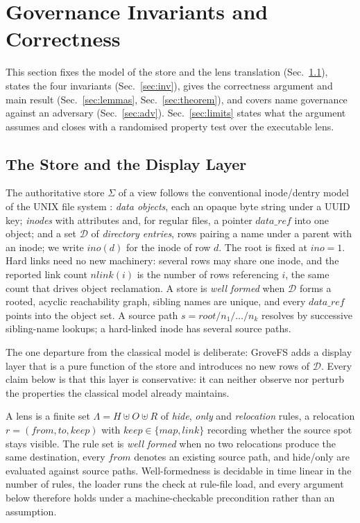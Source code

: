 \documentclass[numberedsection,acmtos]{acmart}
\begin{document}
\section{Governance Invariants and Correctness}
\label{sec:formal}

This section fixes the model of the store and the lens translation
(Sec.~\ref{sec:model}), states the four invariants (Sec.~\ref{sec:inv}), gives
the correctness argument and main result (Sec.~\ref{sec:lemmas},
Sec.~\ref{sec:theorem}), and covers name governance against an adversary
(Sec.~\ref{sec:adv}). Sec.~\ref{sec:limits} states what the argument assumes
and closes with a randomised property test over the executable lens.

\subsection{The Store and the Display Layer}
\label{sec:model}

The authoritative store $\Sigma$ of a view follows the conventional
inode/dentry model of the UNIX file system \citep{fuse,unix}: \emph{data
objects}, each an opaque byte string under a UUID key; \emph{inodes} with
attributes and, for regular files, a pointer $\mathit{data\_ref}$ into one
object; and a set $\mathcal{D}$ of \emph{directory entries}, rows pairing a
name under a parent with an inode; we write $\mathit{ino}(d)$ for the inode of
row $d$. The root is fixed at $\mathit{ino}=1$. Hard links need no new
machinery: several rows may share one inode, and the reported link count
$\mathit{nlink}(i)$ is the number of rows referencing $i$, the same count that
drives object reclamation. A store is \emph{well formed} when $\mathcal{D}$
forms a rooted, acyclic reachability graph, sibling names are unique, and
every $\mathit{data\_ref}$ points into the object set. A source path
$s=\mathit{root}/n_1/\dots/n_k$ resolves by successive sibling-name lookups;
a hard-linked inode has several source paths.

The one departure from the classical model is deliberate: GroveFS adds a
display layer that is a pure function of the store and introduces no new rows
of $\mathcal{D}$. Every claim below is that this layer is conservative: it can
neither observe nor perturb the properties the classical model already
maintains.

A lens is a finite set $\Lambda = H \uplus O \uplus R$ of \emph{hide},
\emph{only} and \emph{relocation} rules, a relocation
$r = (\mathit{from}, \mathit{to}, \mathit{keep})$ with
$\mathit{keep} \in \{\mathit{map},\mathit{link}\}$ recording whether the
source spot stays visible. The rule set is \emph{well formed} when no two
relocations produce the same destination, every $\mathit{from}$ denotes an
existing source path, and hide/only are evaluated against source paths.
Well-formedness is decidable in time linear in the number of rules, the
loader runs the check at rule-file load, and every argument below therefore
holds under a machine-checkable precondition rather than an assumption.
\end{document}
